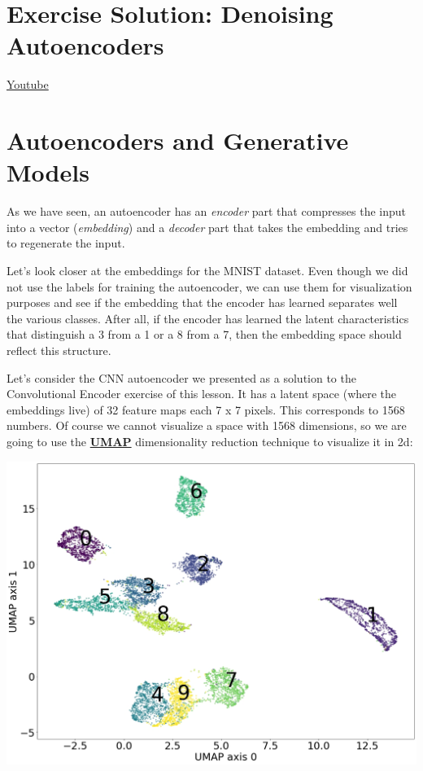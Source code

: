 \section{Exercise Solution: Denoising Autoencoders}
\href{https://www.youtube.com/watch?v=Q2Af3dl-328&ab_channel=Udacity}{Youtube}


\section{Autoencoders and Generative Models}

As we have seen, an autoencoder has an \textit{encoder} part that compresses the input into a vector (\textit{embedding}) and a \textit{decoder} part that takes the embedding and tries to regenerate the input.\newline

Let's look closer at the embeddings for the MNIST dataset. Even though we did not use the labels for training the autoencoder, we can use them for visualization purposes and see if the embedding that the encoder has learned separates well the various classes. After all, if the encoder has learned the latent characteristics that distinguish a 3 from a 1 or a 8 from a 7, then the embedding space should reflect this structure.\newline

Let's consider the CNN autoencoder we presented as a solution to the Convolutional Encoder exercise of this lesson. It has a latent space (where the embeddings live) of 32 feature maps each 7 x 7 pixels. This corresponds to 1568 numbers. Of course we cannot visualize a space with 1568 dimensions, so we are going to use the \href{https://arxiv.org/abs/1802.03426}{\textbf{UMAP}} dimensionality reduction technique to visualize it in 2d:

\includegraphics[width=1\linewidth]{img//cnn//autoencoders/mnist-umap.jpeg}

